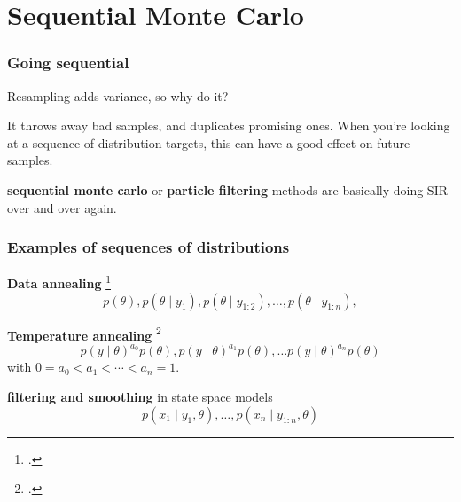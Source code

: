 \documentclass{beamer}
\begin{document}
\section{Sequential Monte Carlo}
\begin{frame}[fragile]
\frametitle{Going sequential}

Resampling adds variance, so why do it?
\newline

It throws away bad samples, and duplicates promising ones. When you're looking at a sequence of distribution targets, this can have a good effect on future samples.
\pause
\newline

{\bf sequential monte carlo} or {\bf particle filtering} methods are basically doing SIR over and over again.

\end{frame}

\begin{frame}[fragile]
\frametitle{Examples of sequences of distributions}

{\bf Data annealing} \footcite{Chopin}
\[
p(\theta), p(\theta \mid y_1), p(\theta \mid y_{1:2}), \ldots, p(\theta \mid y_{1:n}),
\]

{\bf Temperature annealing} \footcite{Neal}
\[
p(y \mid \theta)^{a_0} p(\theta), p(y \mid \theta)^{a_1} p(\theta),  \ldots p(y \mid \theta)^{a_n} p(\theta)
\]
with $0 = a_0 < a_1 < \cdots < a_n = 1$. 
\newline


{\bf filtering and smoothing} in state space models
\[
p(x_1 \mid y_1, \theta), \ldots , p(x_{n} \mid y_{1:n}, \theta)
\]

\end{frame}
\end{document}

